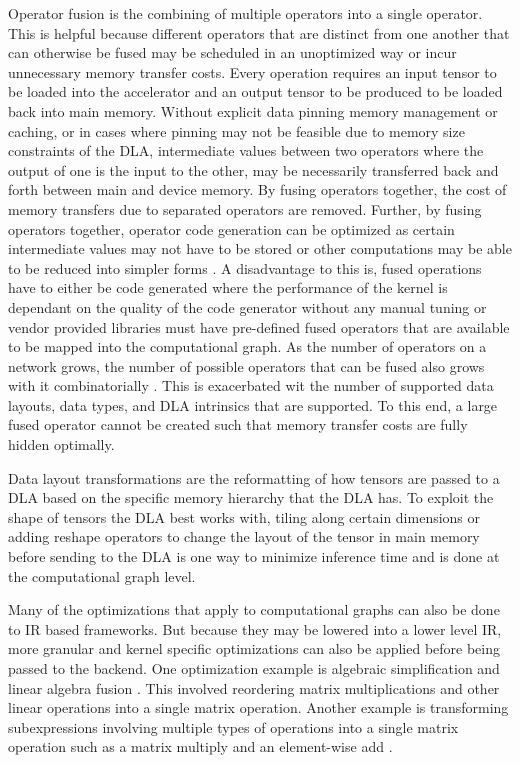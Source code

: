 Operator fusion is the combining of multiple operators into a single operator.
This is helpful because different operators that are distinct from one another
that can otherwise be fused may be scheduled in an unoptimized way or incur
unnecessary memory transfer costs. Every operation requires an input tensor to
be loaded into the accelerator and an output tensor to be produced to be loaded
back into main memory. Without explicit data pinning memory management or
caching, or in cases where pinning may not be feasible due to memory size
constraints of the DLA, intermediate values between two operators where the
output of one is the input to the other, may be necessarily transferred back
and forth between main and device memory. By fusing operators together,
the cost of memory transfers due to separated operators are removed.
Further, by fusing operators together, operator code generation can
be optimized as certain intermediate values may not have to be stored or other
computations may be able to be reduced into simpler forms \cite{TVM} \cite{ONNX}.
A disadvantage to this is, fused operations have to either be code generated
where the performance of the kernel is dependant on the quality of the code
generator without any manual tuning or vendor provided libraries must have
pre-defined fused operators that are available to be mapped into the computational
graph. As the number of operators on a network grows, the number of possible
operators that can be fused also grows with it combinatorially \cite{TVM}.
This is exacerbated wit the number of supported data layouts, data types, 
and DLA intrinsics that are supported. To this end, a large fused operator
cannot be created such that memory transfer costs are fully hidden optimally.

Data layout transformations are the reformatting of how tensors are passed
to a DLA based on the specific memory hierarchy that the DLA has. To exploit
the shape of tensors the DLA best works with, tiling along certain dimensions or
adding reshape operators to change the layout of the tensor in main memory before
sending to the DLA is one way to minimize inference time and is done at the
computational graph level.

Many of the optimizations that apply to computational graphs can also be done
to IR based frameworks. But because they may be lowered into a lower level IR,
more granular and kernel specific optimizations can also be applied before
being passed to the backend. One optimization example is algebraic
simplification and linear algebra fusion \cite{DLVM}. This involved reordering
matrix multiplications and other linear operations into a single matrix
operation. Another example is transforming subexpressions involving multiple
types of operations into a single matrix operation such as a matrix multiply
and an element-wise add \cite{DLVM}.

